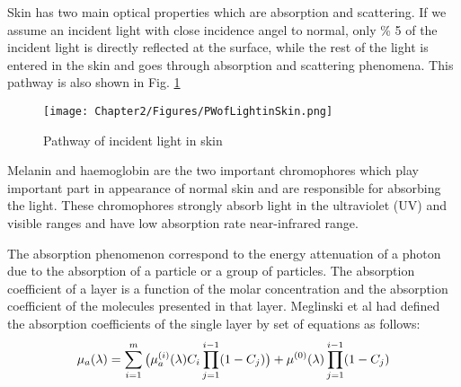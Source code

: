 Skin has two main optical properties which are absorption and scattering. If we assume an incident light with close incidence angel to normal, only \% 5 of the incident light is directly reflected at the surface, while the rest of the light is entered in the skin and goes through absorption and scattering phenomena. This pathway is also shown in Fig. \ref{fig:pathwayofLight}
	\begin{figure}[h]
	\centering
	\texttt{[image: Chapter2/Figures/PWofLightinSkin.png]}	
	\caption{Pathway of incident light in skin \cite{storring2000estimation}}
	\label{fig:pathwayofLight}
	\end{figure}

	Melanin and haemoglobin are the two important chromophores which play important part in appearance of normal skin and are responsible for absorbing the light. These chromophores strongly absorb light in the ultraviolet (UV) and visible ranges and have low absorption rate near-infrared range.	 

	The absorption phenomenon correspond to the energy attenuation of a photon due to the absorption of a particle or a group of particles. The absorption coefficient of a layer is a function of the molar concentration and the absorption coefficient of the molecules presented in that layer. Meglinski et al \cite{meglinski2002quantitative} had defined the absorption coefficients of the single layer by set of equations as follows:
	\begin{equation}
	\footnotesize	
	\mu_{a}(\lambda)= \sum_{i=1}^{m}\big(\mu_{a}^{(i)}(\lambda)C_{i}\prod_{j=1}^{i-1}(1-C_{j})\big)+\mu^{(0)}(\lambda)\prod_{j=1}^{i-1}(1-C_{j})
	\label{Eq:AbsorptionCoefficient}
	\end{equation}

